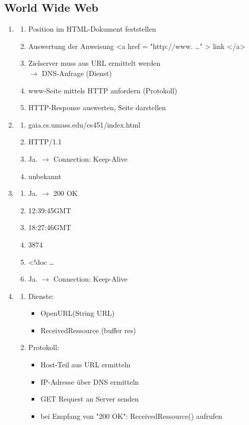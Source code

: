 \subsection{World Wide Web}
\begin{enumerate}
	\item
	\begin{enumerate}
		\item Position im HTML-Dokument feststellen
		\item Auswertung der Anweisung <a href = "http://www. \ldots " > link </a>
		\item Zielserver muss aus URL ermittelt werden\\$\to$ DNS-Anfrage (Dienst)
		\item www-Seite mittels HTTP anfordern (Protokoll)
		\item HTTP-Response auswerten, Seite darstellen
	\end{enumerate}
	\item 
	\begin{enumerate}
		\item gaia.cs.umass.edu/cs451/index.html
		\item HTTP/1.1
		\item Ja. $\to$ Connection: Keep-Alive 
		\item unbekannt
	\end{enumerate}
	\item
	\begin{enumerate}
		\item Ja. $\to$ 200 OK
		\item 12:39:45GMT
		\item 18:27:46GMT
		\item 3874
		\item <!doc \ldots 
		\item Ja. $\to$  Connection: Keep-Alive		
	\end{enumerate}
	\item 
	\begin{enumerate}
		\item Dienste: 
		\begin{itemize}
			\item OpenURL(String URL)
			\item ReceivedRessource (buffer res)
		\end{itemize}
		\item Protokoll:
		\begin{itemize}
			\item Host-Teil aus URL ermitteln
			\item IP-Adresse über DNS ermitteln
			\item GET Request an Server senden
			\item bei Empfang von "200 OK": ReceivedRessource() aufrufen
		\end{itemize}
	\end{enumerate}
\end{enumerate}

